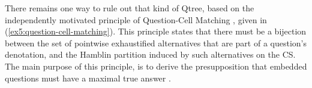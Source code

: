 There remains one way to rule out that kind of Qtree, based on the independently motivated principle of Question-Cell Matching \parencite{Fox2018}, given in (\ref{ex5:question-cell-matching}). This principle states that there must be a bijection between the set of pointwise exhaustified alternatives that are part of a question's denotation, and the Hamblin partition induced by such alternatives on the CS. The main purpose of this principle, is  to derive the presupposition that embedded questions must have a maximal true answer \parencite{Dayal1996}.

\begin{exe}
	\label{ex5:question-cell-matching}
\end{exe}

